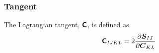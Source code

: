 \documentclass[10pt,letterpaper,oneside]{report}
\newcommand{\ten}[1]{\mbox{\boldmath $#1$}{}}
\newcommand{\tenf}[1]{\mbox{{\sffamily{\bfseries {#1}}}}}
\begin{document}
\begin{itemize}
\subsubsection{Tangent}
The Lagrangian tangent, $\tenf{C}$, is defined as
\begin{align}
\tenf{C}_{IJKL} ={}& 2 \frac{\partial \ten{S}_{IJ} }{\partial \ten{C}_{KL} }  
\\

\end{align}
\end{itemize}
\end{document}
